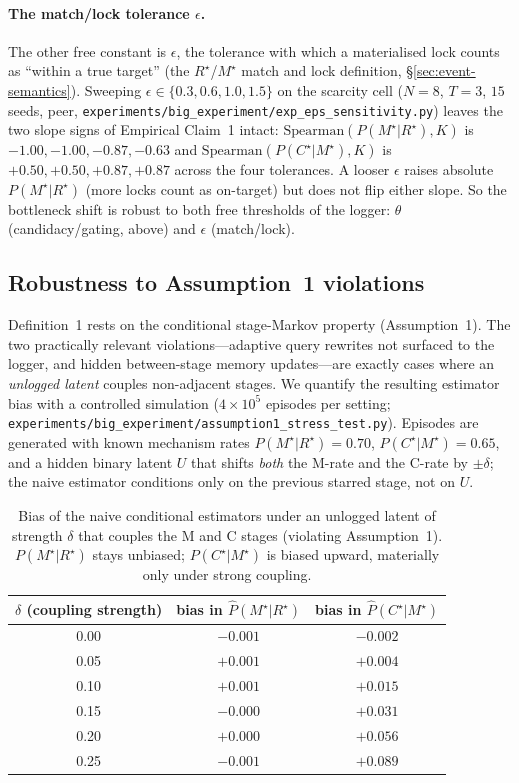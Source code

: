 \documentclass{article}
\newcommand{\method}[1]{\texttt{#1}}
\begin{document}
\paragraph{The match/lock tolerance $\epsilon$.} The other free constant is
$\epsilon$, the tolerance with which a materialised lock counts as ``within a
true target'' (the $R^\star$/$M^\star$ match and lock definition, \S\ref{sec:event-semantics}).
Sweeping $\epsilon\in\{0.3,0.6,1.0,1.5\}$ on the scarcity cell ($N{=}8$, $T{=}3$,
$15$ seeds, peer, \method{experiments/big\_experiment/exp\_eps\_sensitivity.py})
leaves the two slope signs of Empirical Claim~1 intact: $\mathrm{Spearman}(P(M^\star|R^\star),K)$
is $-1.00,-1.00,-0.87,-0.63$ and $\mathrm{Spearman}(P(C^\star|M^\star),K)$ is
$+0.50,+0.50,+0.87,+0.87$ across the four tolerances. A looser $\epsilon$ raises
absolute $P(M^\star|R^\star)$ (more locks count as on-target) but does not flip
either slope. So the bottleneck shift is robust to both free thresholds of the
logger: $\theta$ (candidacy/gating, above) and $\epsilon$ (match/lock).

\subsection{Robustness to Assumption~1 violations}
\label{app:assumption1-stress}

Definition~1 rests on the conditional stage-Markov property (Assumption~1). The two practically relevant violations---adaptive query rewrites not surfaced to the logger, and hidden between-stage memory updates---are exactly cases where an \emph{unlogged latent} couples non-adjacent stages. We quantify the resulting estimator bias with a controlled simulation ($4\!\times\!10^5$ episodes per setting; \method{experiments/big\_experiment/assumption1\_stress\_test.py}). Episodes are generated with known mechanism rates $P(M^\star|R^\star){=}0.70$, $P(C^\star|M^\star){=}0.65$, and a hidden binary latent $U$ that shifts \emph{both} the M-rate and the C-rate by $\pm\delta$; the naive estimator conditions only on the previous starred stage, not on $U$.

\begin{table}[h]
\caption{Bias of the naive conditional estimators under an unlogged latent of strength $\delta$ that couples the M and C stages (violating Assumption~1). $P(M^\star|R^\star)$ stays unbiased; $P(C^\star|M^\star)$ is biased upward, materially only under strong coupling.}
\label{tab:assumption1-stress}
\centering
\small
\begin{tabular}{c c c}
\toprule
$\delta$ (coupling strength) & bias in $\hat P(M^\star|R^\star)$ & bias in $\hat P(C^\star|M^\star)$ \\
\midrule
0.00 & $-0.001$ & $-0.002$ \\
0.05 & $+0.001$ & $+0.004$ \\
0.10 & $+0.001$ & $+0.015$ \\
0.15 & $-0.000$ & $+0.031$ \\
0.20 & $+0.000$ & $+0.056$ \\
0.25 & $-0.001$ & $+0.089$ \\
\bottomrule
\end{tabular}
\end{table}
\end{document}
